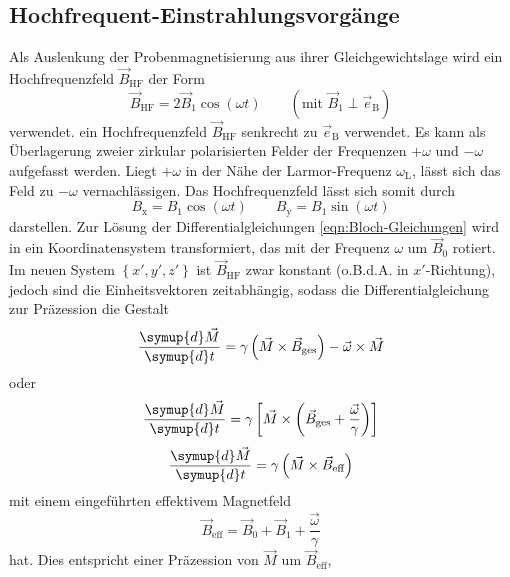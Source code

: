 \subsection{Hochfrequent-Einstrahlungsvorgänge}
\label{sec:HF-Einstrahlung}

Als Auslenkung der Probenmagnetisierung aus ihrer Gleichgewichtslage wird
ein Hochfrequenzfeld $\vec{B}_\text{HF}$ der Form
\begin{equation*}
 \vec{B}_\text{HF} = 2 \vec{B}_1 \cos\!\left(\omega t\right)
 \quad\quad (\text{mit } \vec{B}_1 \perp \vec{e}_\text{B})
\end{equation*}
verwendet.
ein Hochfrequenzfeld $\vec{B}_\text{HF}$ senkrecht zu $\vec{e}_\text{B}$ verwendet.
Es kann als Überlagerung zweier zirkular polarisierten Felder der
Frequenzen $+\omega$ und $-\omega$ aufgefasst werden.
Liegt $+\omega$ in der Nähe der Larmor-Frequenz $\omega_\text{L}$,
lässt sich das Feld zu $-\omega$ vernachlässigen.
Das Hochfrequenzfeld lässt sich somit durch
\begin{equation*}
  B_\text{x} = B_1 \cos\!\left(\omega t\right) \quad\quad
  B_\text{y} = B_1 \sin\!\left(\omega t\right)
\end{equation*}
darstellen.
Zur Lösung der Differentialgleichungen \eqref{eqn:Bloch-Gleichungen} wird in ein
Koordinatensystem transformiert, das mit der Frequenz $\omega$ um $\vec{B}_0$
rotiert. Im neuen System $\left\{x', y', z'\right\}$
ist $\vec{B}_\text{HF}$ zwar konstant (o.B.d.A. in $x'$-Richtung),
jedoch sind die Einheitsvektoren zeitabhängig,
sodass die Differentialgleichung zur Präzession die Gestalt
\begin{equation*}
 \frac{\symup{d} \vec{M}}{\symup{d} t} =
 \gamma \left(\vec{M} \times \vec{B}_\text{ges}\right)
 -\vec{\omega} \times \vec{M}
\end{equation*}
oder
\begin{equation*}
 \frac{\symup{d} \vec{M}}{\symup{d} t} =
 \gamma \left[\vec{M} \times \left(\vec{B}_\text{ges}
 + \frac{\vec{\omega}}{\gamma}\right)\right]
\end{equation*}
\begin{equation*}
  \frac{\symup{d} \vec{M}}{\symup{d} t} =
  \gamma \left(\vec{M} \times \vec{B}_\text{eff}\right)
\end{equation*}
mit einem eingeführten effektivem Magnetfeld
\begin{equation*}
  \vec{B}_\text{eff} = \vec{B}_0 + \vec{B}_1 + \frac{\vec{\omega}}{\gamma}
\end{equation*}
hat.
Dies entspricht einer Präzession von $\vec{M}$ um $\vec{B}_\text{eff}$,

